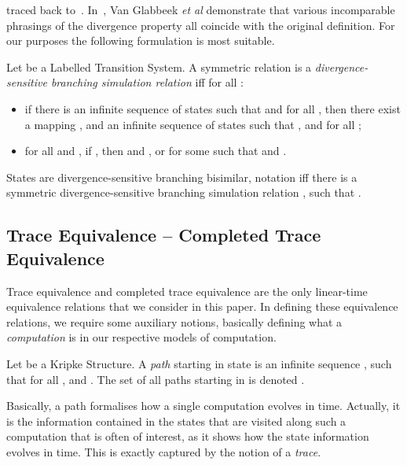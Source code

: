 \documentclass{llncs}
\newcommand{\etal}{\emph{et al}\xspace}
\begin{document}
traced back to~\cite{vanGlabbeek96}.
In~\cite{DBLP:journals/fuin/GlabbeekLT09}, Van Glabbeek
\etal demonstrate that various incomparable phrasings of
the divergence property all coincide with the original definition.
For our purposes the following formulation is most suitable.
\newcommand{\nat}{\ensuremath{\mathbb{N}}}
\begin{definition}
Let  be a Labelled Transition System.
A symmetric relation  is a \emph{divergence-sensitive
branching simulation relation} iff for all :
\begin{itemize}

\item if there is an infinite sequence of states 
such that  and  for all , then
there exist a mapping , and an infinite sequence of
states  such that ,  and  for all ;

\item for all  and , if
, then  and , or
 for some 
such that  and  .

\end{itemize}
States  are divergence-sensitive branching bisimilar,
notation  iff there is a symmetric divergence-sensitive
branching simulation relation , such that .
\end{definition}



\subsection{Trace Equivalence -- Completed Trace Equivalence}
\label{sec:traces}

Trace equivalence and completed trace equivalence are the only
linear-time equivalence relations that we consider in this paper. In
defining these equivalence relations, we require some auxiliary notions,
basically defining what a \emph{computation} is in our respective
models of computation.

\newcommand{\paths}[1]{\ensuremath{\mathsf{Paths}(#1)}}
\begin{definition} Let  be a Kripke
Structure. A \emph{path} starting in state  is an infinite
sequence , such that  for
all , and . The set of all paths starting in  is denoted
.
\end{definition}
Basically, a path formalises how a single computation evolves in
time. Actually, it is the information contained in the states that are
visited along such a computation that is often of interest, as it shows
how the state information evolves in time. This is exactly captured
by the notion of a \emph{trace}.
\end{document}
